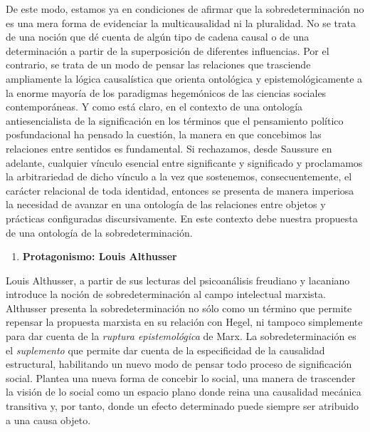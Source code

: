De este modo, estamos ya en condiciones de afirmar que la sobredeterminación no es una mera forma de evidenciar la multicausalidad ni la pluralidad. No se trata de una noción que dé cuenta de algún tipo de cadena causal o de una determinación a partir de la superposición de diferentes influencias. Por el contrario, se trata de un modo de pensar las relaciones que trasciende ampliamente la lógica causalística que orienta ontológica y epistemológicamente a la enorme mayoría de los paradigmas hegemónicos de las ciencias sociales contemporáneas. Y como está claro, en el contexto de una ontología antiesencialista de la significación en los términos que el pensamiento político posfundacional ha pensado la cuestión, la manera en que concebimos las relaciones entre sentidos es fundamental. Si rechazamos, desde Saussure en adelante, cualquier vínculo esencial entre significante y significado y proclamamos la arbitrariedad de dicho vínculo a la vez que sostenemos, consecuentemente, el carácter relacional de toda identidad, entonces se presenta de manera imperiosa la necesidad de avanzar en una ontología de las relaciones entre objetos y prácticas configuradas discursivamente. En este contexto debe nuestra propuesta de una ontología de la sobredeterminación.

\begin{enumerate}
\def\labelenumi{\arabic{enumi}.}
\item
  \textbf{Protagonismo: Louis Althusser}
\end{enumerate}

Louis Althusser, a partir de sus lecturas del psicoanálisis freudiano y lacaniano introduce la noción de sobredeterminación al campo intelectual marxista. Althusser presenta la sobredeterminación no sólo como un término que permite repensar la propuesta marxista en su relación con Hegel, ni tampoco simplemente para dar cuenta de la \emph{ruptura epistemológica} de Marx. La sobredeterminación es el \emph{suplemento} que permite dar cuenta de la especificidad de la causalidad estructural, habilitando un nuevo modo de pensar todo proceso de significación social. Plantea una nueva forma de concebir lo social, una manera de trascender la visión de lo social como un espacio plano donde reina una causalidad mecánica transitiva y, por tanto, donde un efecto determinado puede siempre ser atribuido a una causa objeto.

